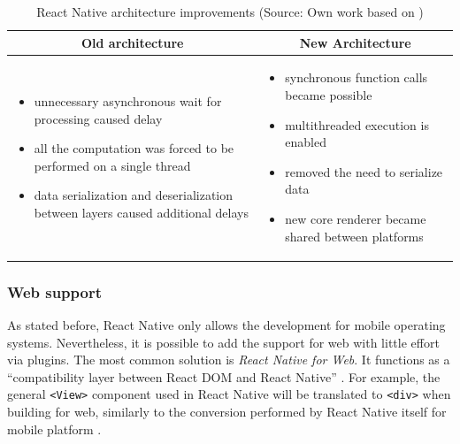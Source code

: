 \begin{table}[h]
    \centering
    \caption{React Native architecture improvements (Source: Own work based on \cite{react_native_docs_why_new_architecture})}
    \label{tab:rn_architecture_improvements}
    \begin{tabular}{ |p{}|p{}| }
        \hline
        \multicolumn{1}{|c|}{\textbf{Old architecture}}&\multicolumn{1}{|c|}{\textbf{New Architecture}}\\
        \hline
        \begin{itemize}[nosep]
            \item unnecessary asynchronous wait for processing caused delay 
            \item all the computation was forced to be performed on a single thread
            \item data serialization and deserialization between layers caused additional delays
        \end{itemize}&
        \begin{itemize}[nosep]
            \item synchronous function calls became possible
            \item multithreaded execution is enabled
            \item removed the need to serialize data
            \item new core renderer became shared between platforms
        \end{itemize}\\
        \hline
    \end{tabular}
\end{table}

\subsubsection*{Web support}

As stated before, React Native only allows the development for mobile operating systems. Nevertheless, it is possible to add the support for web with little effort via plugins. The most common solution is \emph{React Native for Web}. It functions as a ``compatibility layer between React DOM and React Native'' \cite{react_native_web_docs}. For example, the general \texttt{<View>} component used in React Native will be translated to \texttt{<div>} when building for web, similarly to the conversion performed by React Native itself for mobile platform \cite{harsh_complete_guide_to_rn_web}. 

